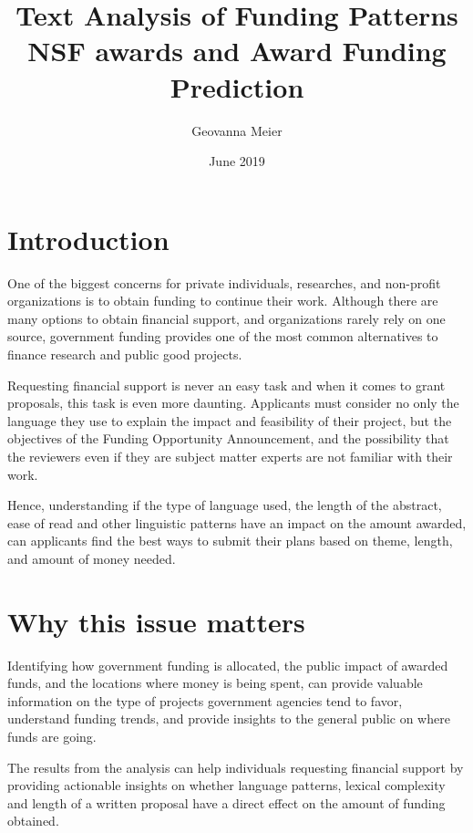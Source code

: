 \documentclass[11pt, oneside]{article}   	%
\title{Text Analysis of Funding Patterns NSF awards and Award Funding Prediction}
\author{Geovanna Meier}
\date{June 2019}							%
\begin{document}
\maketitle

\vspace{15mm}

\tableofcontents

\break

\section{Introduction}

One of the biggest concerns for private individuals, researches, and non-profit organizations is to obtain funding to continue their work. Although there are many options to obtain financial support, and organizations rarely rely on one source, government funding provides one of the most common alternatives to finance research and public good projects.

Requesting financial support is never an easy task and when it comes to grant proposals, this task is even more daunting. Applicants must consider no only the language they use to explain the impact and feasibility of their project, but the objectives of the Funding Opportunity Announcement, and the possibility that the reviewers even if they are subject matter experts are not familiar with their work.

Hence, understanding if the type of language used, the length of the abstract, ease of read and other linguistic patterns  have an impact on the amount awarded, can applicants find the best ways to submit their plans based on theme, length, and amount of money needed.

\section{Why this issue matters}

Identifying how government funding is allocated, the public impact of awarded funds, and the locations where money is being spent, can provide valuable information on the type of projects government agencies tend to favor, understand funding trends, and provide insights to the general public on where funds are going.

The results from the analysis can help individuals requesting financial support by providing actionable insights on whether language patterns, lexical complexity and length of a written proposal have a direct effect on the amount of funding obtained.   
\end{document}
